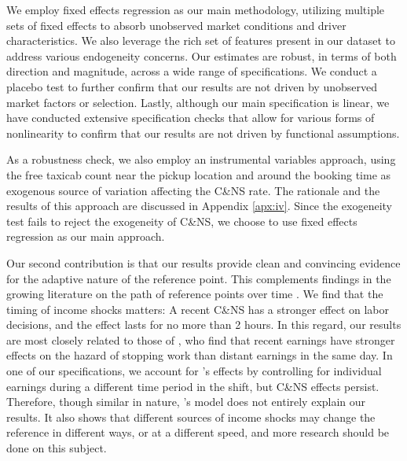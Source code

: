 \documentclass[reviewmode,AEJ]{AEA}
\begin{document}
We employ fixed effects regression as our main methodology, utilizing multiple sets of fixed effects 
to absorb unobserved market conditions and driver characteristics. We also leverage the rich set of 
features present in our dataset to address various endogeneity concerns. Our estimates are robust, 
in terms of both direction and magnitude, across a wide range of specifications. We conduct a placebo 
test to further confirm that our results are not driven by unobserved market factors or selection. Lastly, 
although our main specification is linear, we have conducted extensive specification checks that allow for
various forms of nonlinearity to confirm that our results are not driven by functional assumptions.

As a robustness check, we also employ an instrumental variables approach, using the free taxicab count near 
the pickup location and around the booking time as exogenous source of variation affecting the C\&NS rate.
The rationale and the results of this approach are discussed in Appendix \ref{apx:iv}. 
Since the exogeneity test fails to reject the exogeneity of C\&NS, 
we choose to use fixed effects regression as our main approach.




Our second contribution is that our results provide clean and convincing evidence for the adaptive nature
of the reference point. This complements findings in the growing literature on the path of reference points
over time \citep{dellavigna2017reference,thakral2018daily}. We find that the timing of income shocks matters:
A recent C\&NS has a stronger effect on labor decisions, and the effect lasts for no more than 2 hours. 
In this regard, our results are most closely related to those of \citet{thakral2018daily}, who find that 
recent earnings have stronger effects on the hazard of stopping work than distant earnings in the same day.
In one of our specifications, we account for \citeauthor{thakral2018daily}'s effects by controlling for
individual earnings during a different time period in the shift, but C\&NS effects persist. Therefore,
though similar in nature, \citeauthor{thakral2018daily}'s model does not entirely explain our results. 
It also shows that different sources of income shocks may change the reference in different ways, or at
a different speed, and more research should be done on this subject.
\end{document}
